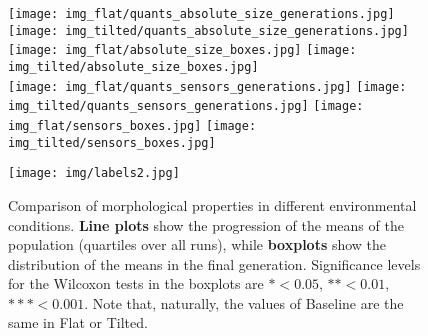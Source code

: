 \documentclass[utf8]{frontiersSCNS} %
\begin{document}

 
 

\begin{figure}[t]
\centering
    \texttt{[image: img\_flat/quants\_absolute\_size\_generations.jpg]}
      \texttt{[image: img\_tilted/quants\_absolute\_size\_generations.jpg]}
    \texttt{[image: img\_flat/absolute\_size\_boxes.jpg]}
    \texttt{[image: img\_tilted/absolute\_size\_boxes.jpg]}
        \\
    \texttt{[image: img\_flat/quants\_sensors\_generations.jpg]}
      \texttt{[image: img\_tilted/quants\_sensors\_generations.jpg]}
    \texttt{[image: img\_flat/sensors\_boxes.jpg]}
    \texttt{[image: img\_tilted/sensors\_boxes.jpg]}
    \\
 
    \begin{center}
     \texttt{[image: img/labels2.jpg]}
        \end{center}
    \caption{Comparison of morphological properties in different environmental conditions. \textbf{Line plots} show the progression of the means of the population (quartiles over all runs), while \textbf{boxplots} show the distribution of the means in the final generation. Significance levels for the Wilcoxon tests in the boxplots are $* < 0.05$, $** < 0.01$, $*** < 0.001$. Note that, naturally, the values of Baseline are the same in Flat or Tilted.}
    \label{fig:morphologies_gens_seasonal}
 
\end{figure}
\end{document}
